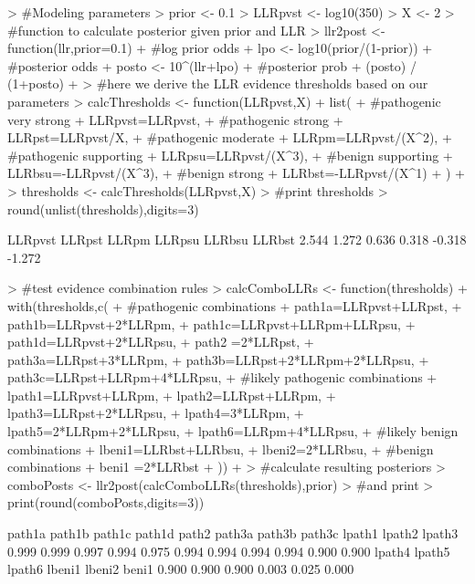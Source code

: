 \documentclass[12pt]{article}
\begin{document}
\begin{Schunk}
\begin{Sinput}
> #Modeling parameters
> prior <- 0.1
> LLRpvst <- log10(350)
> X <- 2
> #function to calculate posterior given prior and LLR
> llr2post <- function(llr,prior=0.1) {
+   #log prior odds
+ 	lpo <- log10(prior/(1-prior))
+ 	#posterior odds
+ 	posto <- 10^(llr+lpo)
+ 	#posterior prob
+ 	(posto) / (1+posto)
+ }
> #here we derive the LLR evidence thresholds based on our parameters
> calcThresholds <- function(LLRpvst,X) {
+   list(
+     #pathogenic very strong
+   	LLRpvst=LLRpvst,
+   	#pathogenic strong
+   	LLRpst=LLRpvst/X,
+   	#pathogenic moderate
+   	LLRpm=LLRpvst/(X^2),
+   	#pathogenic supporting
+   	LLRpsu=LLRpvst/(X^3),
+   	#benign supporting
+   	LLRbsu=-LLRpvst/(X^3),
+   	#benign strong
+   	LLRbst=-LLRpvst/(X^1)
+   )
+ }
> thresholds <- calcThresholds(LLRpvst,X)
> #print thresholds
> round(unlist(thresholds),digits=3)
\end{Sinput}
\begin{Soutput}
LLRpvst  LLRpst   LLRpm  LLRpsu  LLRbsu  LLRbst 
  2.544   1.272   0.636   0.318  -0.318  -1.272 
\end{Soutput}
\begin{Sinput}
> #test evidence combination rules
> calcComboLLRs <- function(thresholds) {
+   with(thresholds,c(
+     #pathogenic combinations
+   	path1a=LLRpvst+LLRpst,
+   	path1b=LLRpvst+2*LLRpm,
+   	path1c=LLRpvst+LLRpm+LLRpsu,
+   	path1d=LLRpvst+2*LLRpsu,
+   	path2 =2*LLRpst,
+   	path3a=LLRpst+3*LLRpm,
+   	path3b=LLRpst+2*LLRpm+2*LLRpsu,
+   	path3c=LLRpst+LLRpm+4*LLRpsu,
+   	#likely pathogenic combinations
+   	lpath1=LLRpvst+LLRpm,
+   	lpath2=LLRpst+LLRpm,
+   	lpath3=LLRpst+2*LLRpsu,
+   	lpath4=3*LLRpm,
+   	lpath5=2*LLRpm+2*LLRpsu,
+   	lpath6=LLRpm+4*LLRpsu,
+   	#likely benign combinations
+   	lbeni1=LLRbst+LLRbsu,
+   	lbeni2=2*LLRbsu,
+   	#benign combinations
+   	beni1 =2*LLRbst
+   ))
+ }
> #calculate resulting posteriors
> comboPosts <- llr2post(calcComboLLRs(thresholds),prior)
> #and print
> print(round(comboPosts,digits=3))
\end{Sinput}
\begin{Soutput}
path1a path1b path1c path1d  path2 path3a path3b path3c lpath1 lpath2 lpath3 
 0.999  0.999  0.997  0.994  0.975  0.994  0.994  0.994  0.994  0.900  0.900 
lpath4 lpath5 lpath6 lbeni1 lbeni2  beni1 
 0.900  0.900  0.900  0.003  0.025  0.000 
\end{Soutput}
\end{Schunk}
\end{document}
